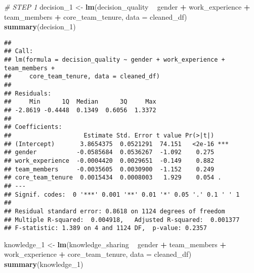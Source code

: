 \documentclass[]{article}
\newenvironment{Shaded}{\begin{snugshade}}{\end{snugshade}}
\newcommand{\CommentTok}[1]{\textcolor[rgb]{0.56,0.35,0.01}{\textit{#1}}}
\newcommand{\DataTypeTok}[1]{\textcolor[rgb]{0.13,0.29,0.53}{#1}}
\newcommand{\DecValTok}[1]{\textcolor[rgb]{0.00,0.00,0.81}{#1}}
\newcommand{\KeywordTok}[1]{\textcolor[rgb]{0.13,0.29,0.53}{\textbf{#1}}}
\newcommand{\NormalTok}[1]{#1}
\newcommand{\OperatorTok}[1]{\textcolor[rgb]{0.81,0.36,0.00}{\textbf{#1}}}
\newcommand{\StringTok}[1]{\textcolor[rgb]{0.31,0.60,0.02}{#1}}
\begin{document}
\begin{Shaded}
\begin{Highlighting}[]
\CommentTok{# STEP 1}
\NormalTok{decision_}\DecValTok{1}\NormalTok{ <-}\StringTok{ }\KeywordTok{lm}\NormalTok{(decision_quality }\OperatorTok{~}\StringTok{ }\NormalTok{gender }\OperatorTok{+}\StringTok{ }\NormalTok{work_experience }\OperatorTok{+}\StringTok{ }\NormalTok{team_members }\OperatorTok{+}\StringTok{ }\NormalTok{core_team_tenure, }\DataTypeTok{data =}\NormalTok{ cleaned_df)}
\KeywordTok{summary}\NormalTok{(decision_}\DecValTok{1}\NormalTok{)}
\end{Highlighting}
\end{Shaded}

\begin{verbatim}
## 
## Call:
## lm(formula = decision_quality ~ gender + work_experience + team_members + 
##     core_team_tenure, data = cleaned_df)
## 
## Residuals:
##     Min      1Q  Median      3Q     Max 
## -2.8619 -0.4448  0.1349  0.6056  1.3372 
## 
## Coefficients:
##                    Estimate Std. Error t value Pr(>|t|)    
## (Intercept)       3.8654375  0.0521291  74.151   <2e-16 ***
## gender           -0.0585684  0.0536267  -1.092    0.275    
## work_experience  -0.0004420  0.0029651  -0.149    0.882    
## team_members     -0.0035605  0.0030900  -1.152    0.249    
## core_team_tenure  0.0015434  0.0008003   1.929    0.054 .  
## ---
## Signif. codes:  0 '***' 0.001 '**' 0.01 '*' 0.05 '.' 0.1 ' ' 1
## 
## Residual standard error: 0.8618 on 1124 degrees of freedom
## Multiple R-squared:  0.004918,   Adjusted R-squared:  0.001377 
## F-statistic: 1.389 on 4 and 1124 DF,  p-value: 0.2357
\end{verbatim}

\begin{Shaded}
\begin{Highlighting}[]
\NormalTok{knowledge_}\DecValTok{1}\NormalTok{ <-}\StringTok{ }\KeywordTok{lm}\NormalTok{(knowledge_sharing }\OperatorTok{~}\StringTok{ }\NormalTok{gender }\OperatorTok{+}\StringTok{ }\NormalTok{team_members }\OperatorTok{+}\StringTok{ }\NormalTok{work_experience }\OperatorTok{+}\StringTok{ }\NormalTok{core_team_tenure, }\DataTypeTok{data =}\NormalTok{ cleaned_df)}
\KeywordTok{summary}\NormalTok{(knowledge_}\DecValTok{1}\NormalTok{)}
\end{Highlighting}
\end{Shaded}
\end{document}
